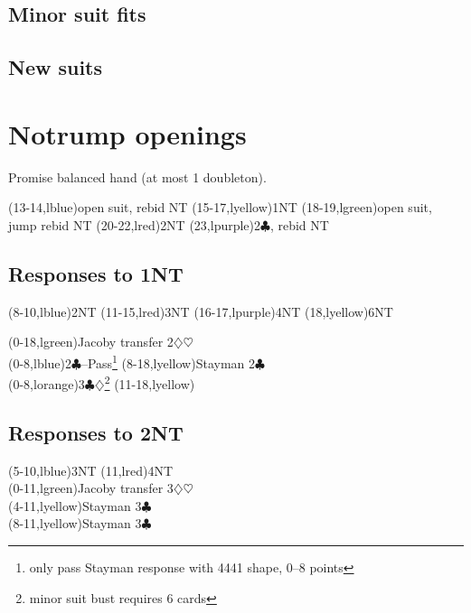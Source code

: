 \documentclass[oneside]{memoir}
\def\C{$\clubsuit$}
\def\D{$\diamondsuit$}
\def\H{$\heartsuit$}
\begin{document}
\section{Minor suit fits}


\section{New suits}


\chapter{Notrump openings}

Promise balanced hand (at most 1 doubleton).\\
\begin{ptable}
\row{}
  \bid(13-14,lblue){open suit, rebid NT}
  \bid(15-17,lyellow){1NT}
  \bid(18-19,lgreen){open suit, jump rebid NT}
  \bid(20-22,lred){2NT}
  \bid(23,lpurple){2\C, rebid NT}\\
\end{ptable}

\section{Responses to 1NT}
\begin{ptable}
  \bid(8-10,lblue){2NT}
  \bid(11-15,lred){3NT}
  \bid(16-17,lpurple){4NT}
  \bid(18,lyellow){6NT}\\
\iffalse %
  \bid(0-10,lgreen){Jacoby transfer 2\D\H}
  \bid(11-15,lblue){Texas transfer 4\D\H}
  \bid(16-18,lgreen){2\D\H}\\
\else
  \bid(0-18,lgreen){Jacoby transfer 2\D\H}\\
\fi
{}
  \bid(0-8,lblue){2\C--Pass\footnote{only pass Stayman response with 4441 shape, 0--8 points}}
  \bid*(8-18,lyellow){Stayman 2\C}\\
  \bid(0-8,lorange){3\C\D\footnote{minor suit bust requires 6 cards}}
  \bid(11-18,lyellow){\clift{Stayman 2\C}}\\
\end{ptable}

\section{Responses to 2NT}
\begin{ptable}
  \bid(5-10,lblue){3NT}
  \bid(11,lred){4NT}\\
  \bid(0-11,lgreen){Jacoby transfer 3\D\H}\\
  \bid(4-11,lyellow){Stayman 3\C}\\
  \bid*(8-11,lyellow){Stayman 3\C}\\
\end{ptable}
\end{document}
